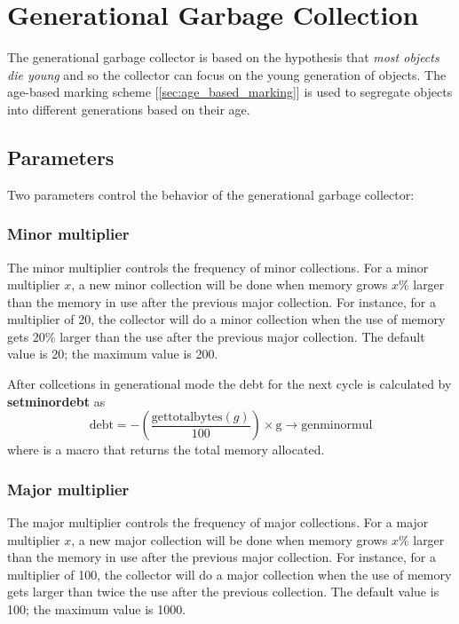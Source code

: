 \documentclass[10pt]{article}
\begin{document}
\section{Generational Garbage Collection} \label{sec:generational_gc}
The generational garbage collector is based on the hypothesis that \textit{most objects die young} and so the collector can focus on the young generation of objects. 
The age-based marking scheme [\ref{sec:age_based_marking}] is used to segregate objects into different generations based on their age.
\subsection{Parameters}
Two parameters control the behavior of the generational garbage collector:
\subsubsection{Minor multiplier} \label{sec:minor_multiplier}
The minor multiplier controls the frequency of minor collections. For a minor multiplier \( x \), a new minor collection will be done when memory grows \( x\%\) larger than the memory in use after the previous major collection. For instance, for a multiplier of 20, the collector will do a minor collection when the use of memory gets 20\% larger than the use after the previous major collection. The default value is 20; the maximum value is 200.

After collcetions in generational mode the debt for the next cycle is calculated by \textbf{setminordebt} as
\begin{equation}
  \text{debt} = -\left(\frac{\text{gettotalbytes}(g)}{100}\right) \times \text{g} \rightarrow \text{genminormul}
\end{equation} 
where  is a macro that returns the total memory allocated.

\subsubsection{Major multiplier} \label{sec:major_multiplier}
The major multiplier controls the frequency of major collections. For a major multiplier \( x \), a new major collection will be done when memory grows \( x\%\) larger than the memory in use after the previous major collection. For instance, for a multiplier of 100, the collector will do a major collection when the use of memory gets larger than twice the use after the previous collection. The default value is 100; the maximum value is 1000.
\end{document}
